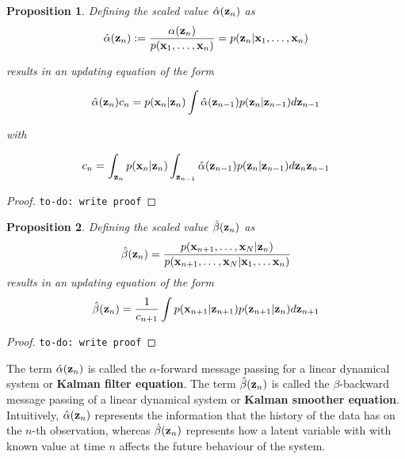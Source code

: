 \documentclass[11pt]{article}
\newtheorem{proposition}{Proposition}[section]
\begin{document}
\begin{proposition}
	Defining the scaled value $\hat\alpha({\bf z}_n)$ as
	\begin{equation}
		\hat\alpha({\bf z}_n) := \frac{\alpha({\bf z}_n)}{p({\bf x}_1, \ldots, {\bf x}_n)} = p({\bf z}_n \vert {\bf x}_1, \ldots, {\bf x}_n)
	\end{equation}
	
	results in an updating equation of the form
	
	\begin{equation}
		\hat\alpha({\bf z}_n) c_n = p({\bf x}_n\vert{\bf z}_n)\int \hat\alpha({\bf z}_{n-1})p({\bf z}_n \vert {\bf z}_{n-1}) d{\bf z}_{n-1}
	\end{equation}
	
	with
	
	\begin{equation}
		c_n = \int_{{\bf z}_n} p({\bf x}_n \vert {\bf z}_n) \int_{{\bf z}_{n-1}} \hat\alpha({\bf z}_{n-1})p({\bf z}_n \vert {\bf z}_{n-1}) d{\bf z}_n{\bf z}_{n-1}
	\end{equation}
\end{proposition}

\begin{proof}
	\texttt{to-do: write proof}
\end{proof}

\begin{proposition}
	Defining the scaled value $\hat\beta({\bf z}_n)$ as
	\begin{equation}
		\hat\beta({\bf z}_n) = \frac{p({\bf x}_{n+1}, \ldots, {\bf x}_N \vert {\bf z}_n)}{p({\bf x}_{n+1}, \ldots, {\bf x}_N \vert {\bf x}_1, \ldots {\bf x}_n)}
	\end{equation}
	results in an updating equation of the form
	\begin{equation}
		\hat\beta({\bf z}_n) = \frac{1}{c_{n+1}}\int p({\bf x}_{n+1}\vert{\bf z}_{n+1})p({\bf z}_{n+1}\vert{\bf z}_n) d{\bf z}_{n+1}
	\end{equation}
\end{proposition}

\begin{proof}
	\texttt{to-do: write proof}
\end{proof}

The term $\hat\alpha({\bf z}_n)$ is called the $\alpha$-forward message passing for a linear dynamical system or \textbf{Kalman filter equation}.  The term $\hat\beta({\bf z}_n)$ is called the $\beta$-backward message passing of a linear dynamical system or \textbf{Kalman smoother equation}. Intuitively, $\hat\alpha({\bf z}_n)$ represents the information that the history of the data has on the $n$-th observation, whereas $\hat\beta({\bf z}_n)$ represents how a latent variable with with known value at time $n$ affects the future behaviour of the system.
\end{document}
